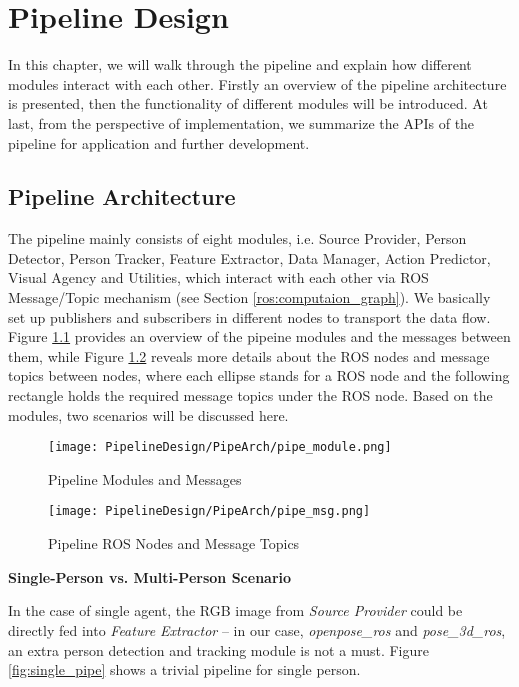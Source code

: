 
\chapter{Pipeline Design}
\label{sec:pipeline_design}

In this chapter, we will walk through the pipeline and explain how different modules interact with each other. Firstly an overview of the pipeline architecture is presented, then the functionality of different modules will be introduced. At last, from the perspective of implementation, we summarize the APIs of the pipeline for application and further development. 

\section{Pipeline Architecture}

The pipeline mainly consists of eight modules, i.e. Source Provider, Person Detector, Person Tracker, Feature Extractor, Data Manager, Action Predictor, Visual Agency and Utilities, which interact with each other via ROS Message/Topic mechanism (see Section \ref{ros:computaion_graph}). We basically set up publishers and subscribers in different nodes to transport the data flow. Figure \ref{fig:pipe_module} provides an overview of the pipeine modules and the messages between them, while Figure \ref{fig:pipe_msg} reveals more details about the ROS nodes and message topics between nodes, where each ellipse stands for a ROS node and the following rectangle holds the required message topics under the ROS node. Based on the modules, two scenarios will be discussed here. 

\begin{figure}[h!]
  \centering
  \texttt{[image: PipelineDesign/PipeArch/pipe\_module.png]}
  \caption{Pipeline Modules and Messages}
  \label{fig:pipe_module}
\end{figure}

\begin{figure}[h!]
  \centering
  \texttt{[image: PipelineDesign/PipeArch/pipe\_msg.png]}
  \caption{Pipeline ROS Nodes and Message Topics}
  \label{fig:pipe_msg}
\end{figure}

\textbf{Single-Person vs. Multi-Person Scenario}

In the case of single agent, the RGB image from \textit{Source Provider} could be directly fed into \textit{Feature Extractor} -- in our case, \textit{openpose\_ros} and \textit{pose\_3d\_ros}, an extra person detection and tracking module is not a must. Figure \ref{fig:single_pipe} shows a trivial pipeline for single person.


